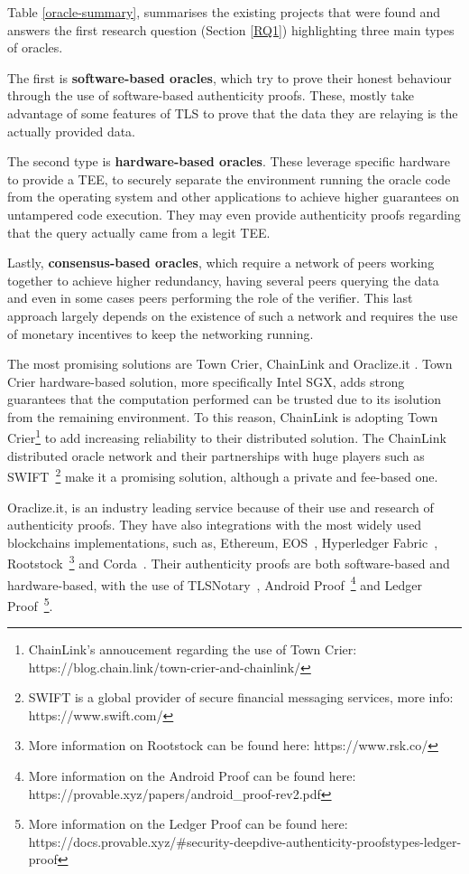 \documentclass[final,3p,12pt,twocolumn]{elsarticle}
\begin{document}
Table \ref{oracle-summary}, summarises the existing projects that were found and answers the first research question (Section \ref{RQ1}) highlighting three main types of oracles.


The first is \textbf{software-based oracles}, which try to prove their honest behaviour through the use of software-based authenticity proofs. These, mostly take advantage of some features of TLS to prove that the data they are relaying is the actually provided data.

The second type is \textbf{hardware-based oracles}. These leverage specific hardware to provide a TEE, to securely separate the environment running the oracle code from the operating system and other applications to achieve higher guarantees on untampered code execution. They may even provide authenticity proofs regarding that the query actually came from a legit TEE.

Lastly, \textbf{consensus-based oracles}, which require a network of peers working together to achieve higher redundancy, having several peers querying the data and even in some cases peers performing the role of the verifier. This last approach largely depends on the existence of such a network and requires the use of monetary incentives to keep the networking running.

The most promising solutions are Town Crier, ChainLink and Oraclize.it .  Town Crier hardware-based solution, more specifically Intel SGX, adds strong guarantees that the computation performed can be trusted due to its isolution from the remaining environment. To this reason, ChainLink is adopting Town Crier\footnote{ChainLink's annoucement regarding the use of Town Crier: https://blog.chain.link/town-crier-and-chainlink/} to add increasing reliability to their distributed solution. The ChainLink distributed oracle network and their partnerships with huge players such as SWIFT~\footnote{SWIFT is a global provider
  of secure financial messaging services, more info: https://www.swift.com/} make it a promising solution, although a private and fee-based one.

Oraclize.it, is an industry leading service because of their use and research of authenticity proofs. They have also integrations with the most widely used blockchains implementations, such as, Ethereum, EOS~\cite{Block.one2018}, Hyperledger Fabric~\cite{Androulaki}, Rootstock~\footnote{More information on Rootstock can be found here: https://www.rsk.co/} and Corda~\cite{Brown2016}. Their authenticity proofs are both software-based and hardware-based, with the use of TLSNotary~\cite{TLSnotary}, Android Proof~\footnote{More information on the Android Proof can be found here: https://provable.xyz/papers/android\_proof-rev2.pdf} and Ledger Proof~\footnote{More information on the Ledger Proof can be found here: https://docs.provable.xyz/\#security-deepdive-authenticity-proofstypes-ledger-proof}.
\end{document}
